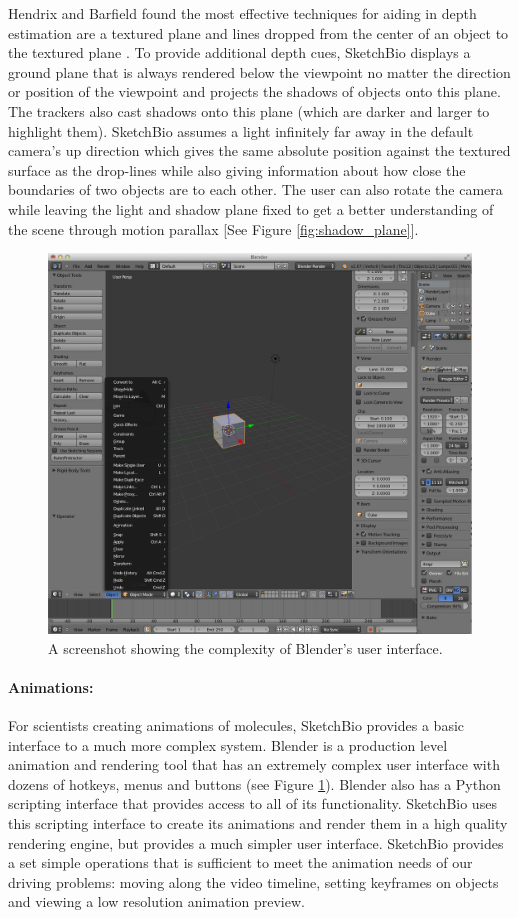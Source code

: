 \documentclass[twocolumn]{bmcart}%
\begin{document}
Hendrix and Barfield found the most effective techniques for aiding in depth estimation are a textured plane and lines dropped from the center of an object to the textured plane \cite{hendrix1995relationship}.
To provide additional depth cues, SketchBio displays a ground plane that is always rendered below the viewpoint no matter the direction or position of the viewpoint and projects the shadows of objects onto this plane.
The trackers also cast shadows onto this plane (which are darker and larger to highlight them).
SketchBio assumes a light infinitely far away in the default camera's up direction which gives the same absolute position against the textured surface as the drop-lines while also giving information about how close the boundaries of two objects are to each other.
The user can also rotate the camera while leaving the light and shadow plane fixed to get a better understanding of the scene through motion parallax [See Figure \ref{fig:shadow_plane}].

\begin{figure}[h]
\centering
\includegraphics[width=0.9\columnwidth]{blender_interface.png}
\caption{A screenshot showing the complexity of Blender's user interface.}
\label{fig:blender_interface}
\end{figure}

\paragraph*{Animations:}
For scientists creating animations of molecules, SketchBio provides a basic interface to a much more complex system.
Blender is a production level animation and rendering tool that has an extremely complex user interface with dozens of hotkeys, menus and buttons (see Figure \ref{fig:blender_interface}).
Blender also has a Python scripting interface that provides access to all of its functionality.
SketchBio uses this scripting interface to create its animations and render them in a high quality rendering engine, but provides a much simpler user interface.
SketchBio provides a set simple operations that is sufficient to meet the animation needs of our driving problems: moving along the video timeline, setting keyframes on objects and viewing a low resolution animation preview.
\end{document}
